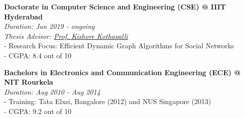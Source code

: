 \textbf{Doctorate in Computer Science and Engineering (CSE) @ IIIT Hyderabad} \\
\emph{Duration: Jan 2019 - ongoing} \\
\emph{Thesis Advisor: \href{https://faculty.iiit.ac.in/~kkishore/}{Prof. Kishore Kothapalli}} \\
- Research Focus: Efficient Dynamic Graph Algorithms for Social Networks \\
- CGPA: 8.4 out of 10

\noindent
\textbf{Bachelors in Electronics and Communication Engineering (ECE) @ NIT Rourkela} \\
\emph{Duration: Aug 2010 - Aug 2014} \\
- Training: Tata Elxsi, Bangalore (2012) and NUS Singapore (2013) \\
- CGPA: 9.2 out of 10
